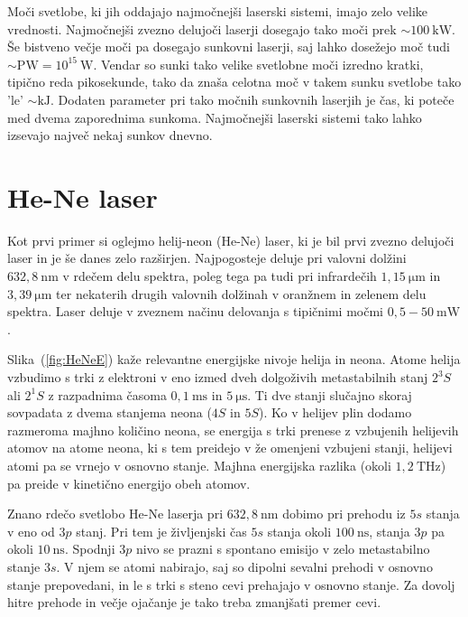 Moči svetlobe, ki jih oddajajo najmočnejši laserski sistemi, imajo zelo velike
vrednosti. Najmočnejši zvezno delujoči laserji dosegajo tako moči prek 
$\sim 100~\si{\kilo\watt}$. Še bistveno večje moči pa dosegajo sunkovni laserji, 
saj lahko dosežejo moč tudi $\sim \si{\peta\watt} = 10^{15}~\si{\watt}$. 
Vendar so sunki tako velike svetlobne moči izredno kratki, tipično reda pikosekunde, tako da
znaša celotna moč v takem sunku svetlobe tako 'le' $\sim \si{\kilo\joule}$. Dodaten 
parameter pri tako močnih sunkovnih laserjih je čas, ki poteče med dvema zaporednima
sunkoma. Najmočnejši laserski sistemi tako lahko izsevajo največ nekaj sunkov dnevno. 

\section{He-Ne laser}

Kot prvi primer si oglejmo helij-neon (He-Ne) laser, ki je bil prvi zvezno 
delujoči laser in je še danes zelo razširjen. Najpogosteje deluje 
pri valovni dolžini $632,8~\si{\nano\metre}$ v rdečem delu spektra, poleg 
tega pa tudi pri infrardečih $1,15~\si{\micro\metre}$ in 
$3,39~\si{\micro\metre}$ ter nekaterih drugih
valovnih dolžinah v oranžnem in zelenem delu spektra. Laser deluje v zveznem 
načinu delovanja s tipičnimi močmi $0,5 - 50~\si{\milli\watt}$.

Slika~(\ref{fig:HeNeE}) kaže relevantne energijske nivoje helija in neona. Atome helija
vzbudimo s trki z elektroni v eno izmed dveh dolgoživih metastabilnih stanj $2^3S$ ali
$2^1S$ z razpadnima časoma $0,1~\si{\milli\second}$ in $5~\si{\micro\second}$.
Ti dve stanji slučajno skoraj sovpadata z dvema stanjema neona ($4S$ in $5S$). 
Ko v helijev plin dodamo razmeroma majhno količino neona, se energija s trki 
prenese z vzbujenih helijevih atomov na atome neona, ki s tem preidejo v 
že omenjeni vzbujeni stanji, helijevi atomi pa se vrnejo v osnovno stanje. 
Majhna energijska razlika (okoli $1,2~\si{\tera\hertz}$) pa preide v
kinetično energijo obeh atomov. 

Znano rdečo svetlobo He-Ne laserja pri $632,8~\si{\nano\metre}$ dobimo 
pri prehodu iz $5s$ stanja v eno od $3p$ stanj. Pri tem je življenjski čas 
$5s$ stanja okoli $100~\si{\nano\second}$, stanja $3p$ pa okoli $10~\si{\nano\second}$.
Spodnji $3p$ nivo se prazni s spontano emisijo v zelo metastabilno stanje $3s$. 
V njem se atomi nabirajo, saj so dipolni sevalni prehodi v osnovno stanje prepovedani,
in le s trki s steno cevi prehajajo v osnovno stanje. Za dovolj hitre prehode in 
večje ojačanje je tako treba zmanjšati premer cevi.

